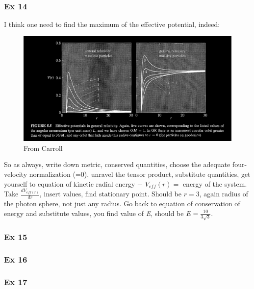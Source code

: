 \subsubsection{Ex 14}
I think one need to find the maximum of the effective potential, indeed:
\begin{figure}[h]
\centering
\includegraphics[width=\linewidth]{imm/ex14.png}
\caption{From Carroll}
\label{imm:ex14.png}
\end{figure}

So as always, write down metric, conserved quantities, choose the adequate four-velocity normalization (=0), unravel the tensor product, substitute quantities, get yourself to equation of kinetic radial energy + $V_{eff}\left( r \right) = $ energy of the system. Take $ \frac{d V_{eff\left( r \right)}}{d r}$,  insert values, find stationary point. Should be $r = 3$, again radius of the photon sphere, not just any radius. Go back to equation of conservation of energy and substitute values, you find value of \emph{E}, should be $E = \frac{10}{3\sqrt{3}}$.

\subsubsection{Ex 15}

\subsubsection{Ex 16}

\subsubsection{Ex 17}

